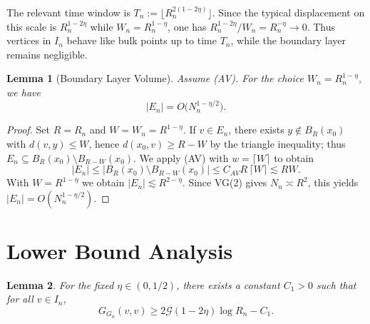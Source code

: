 \documentclass[reqno]{amsart}
\numberwithin{equation}{section}
\newtheorem{lemma}[lemma]{Lemma}
\theoremstyle{definition}
\theoremstyle{remark}
\newcommand{\cG}{\mathcal{G}}
\begin{document}
The relevant time window is $T_n:=\lfloor R_n^{2(1-2\eta)}\rfloor$. Since the typical displacement on this scale is $R_n^{1-2\eta}$ while $W_n=R_n^{1-\eta}$, one has $R_n^{1-2\eta}/W_n=R_n^{-\eta}\to0$. Thus vertices in $I_n$ behave like bulk points up to time $T_n$, while the boundary layer remains negligible.

\begin{lemma}[Boundary Layer Volume]\label{lem:boundary_volume}
Assume (AV). For the choice $W_n = R_n^{1-\eta}$, we have
\[
    |E_n| = O\bigl(N_n^{1-\eta/2}\bigr).
\]
\end{lemma}
\begin{proof}
Set $R=R_n$ and $W=W_n=R^{1-\eta}$. If $v\in E_n$, there exists $y\notin B_R(x_0)$ with $d(v,y)\le W$, hence
$d(x_0,v)\ge R-W$ by the triangle inequality; thus $E_n\subseteq B_R(x_0)\setminus B_{R-W}(x_0)$.
We apply (AV) with $w=\lceil W\rceil$ to obtain
\[
  |E_n|\le |B_R(x_0)\setminus B_{R-W}(x_0)|\le C_{AV} R\,\lceil W\rceil\lesssim R W.
\]
With $W=R^{1-\eta}$ we obtain $|E_n|\lesssim R^{2-\eta}$. Since VG(2) gives $N_n\asymp R^2$, this yields $|E_n|=O(N_n^{1-\eta/2})$.
\end{proof}

\section{Lower Bound Analysis}\label{sec:lower_bound}

\begin{lemma}\label{lem:lower}
For the fixed $\eta \in (0,1/2)$, there exists a constant $C_1 > 0$ such that for all $v \in I_n$,
\[
G_{G_n}(v,v) \geq 2\cG(1-2\eta)\log R_n - C_1.
\]
\end{lemma}
\end{document}
